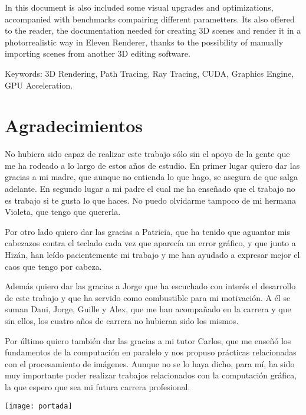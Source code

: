 In this document is also included some visual upgrades and optimizations, accompanied with benchmarks compairing different parametters. Its also offered to the reader, the documentation needed for creating 3D scenes and render it in a photorrealistic way in Eleven Renderer, thanks to the possibility of manually importing scenes from another 3D editing software.

Keywords: 3D Rendering, Path Tracing, Ray Tracing, CUDA, Graphics Engine, GPU Acceleration.


\chapter*{Agradecimientos}

No hubiera sido capaz de realizar este trabajo sólo sin el apoyo de la gente que me ha rodeado a lo largo de estos años de estudio. En primer lugar quiero dar las gracias a mi madre, que aunque no entienda lo que hago, se asegura de que salga adelante. En segundo lugar a mi padre el cual me ha enseñado que el trabajo no es trabajo si te gusta lo que haces. No puedo olvidarme tampoco de mi hermana Violeta, que tengo que quererla.

Por otro lado quiero dar las gracias a Patricia, que ha tenido que aguantar mis cabezazos contra el teclado cada vez que aparecía un error gráfico, y que junto a Hizán, han leído pacientemente mi trabajo y me han ayudado a expresar mejor el caos que tengo por cabeza.

Además quiero dar las gracias a Jorge que ha escuchado con interés el desarrollo de este trabajo y que ha servido como combustible para mi motivación. A él se suman Dani, Jorge, Guille y Alex, que me han acompañado en la carrera y que sin ellos, los cuatro años de carrera no hubieran sido los mismos.

Por último quiero también dar las gracias a mi tutor Carlos, que me enseñó los fundamentos de la computación en paralelo y nos propuso prácticas relacionadas con el procesamiento de imágenes. Aunque no se lo haya dicho, para mí, ha sido muy importante poder realizar trabajos relacionados con la computación gráfica, la que espero que sea mi futura carrera profesional.


\newpage

\texttt{[image: portada]}

\scalebox{5}{\color{white}{Eleven Renderer}}

